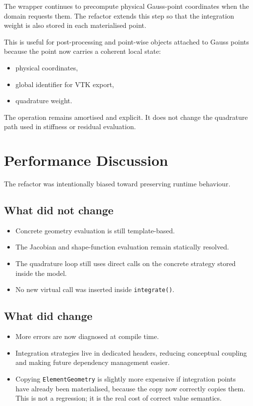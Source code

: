 The wrapper continues to precompute physical Gauss-point coordinates when the
domain requests them.  The refactor extends this step so that the integration
weight is also stored in each materialised point.

This is useful for post-processing and point-wise objects attached to Gauss
points because the point now carries a coherent local state:

\begin{itemize}[nosep]
  \item physical coordinates,
  \item global identifier for VTK export,
  \item quadrature weight.
\end{itemize}

The operation remains amortised and explicit.  It does not change the
quadrature path used in stiffness or residual evaluation.


\section{Performance Discussion}
\label{sec:eg_performance}

The refactor was intentionally biased toward preserving runtime behaviour.

\subsection{What did not change}

\begin{itemize}[nosep]
  \item Concrete geometry evaluation is still template-based.
  \item The Jacobian and shape-function evaluation remain statically resolved.
  \item The quadrature loop still uses direct calls on the concrete strategy
        stored inside the model.
  \item No new virtual call was inserted inside \texttt{integrate()}.
\end{itemize}

\subsection{What did change}

\begin{itemize}[nosep]
  \item More errors are now diagnosed at compile time.
  \item Integration strategies live in dedicated headers, reducing conceptual
        coupling and making future dependency management easier.
  \item Copying \texttt{ElementGeometry} is slightly more expensive if
        integration points have already been materialised, because the copy now
        correctly copies them.  This is not a regression; it is the real cost
        of correct value semantics.
\end{itemize}

